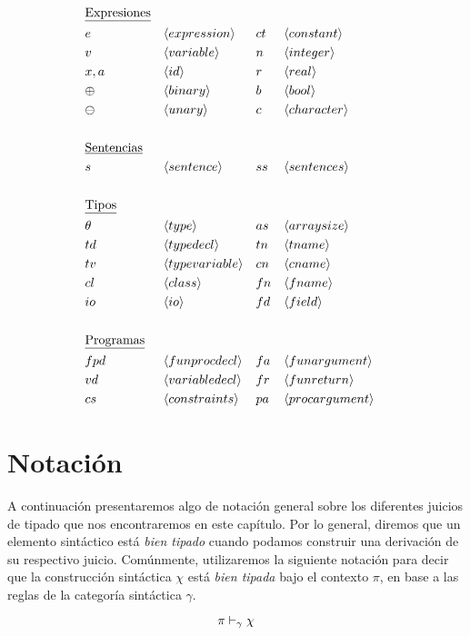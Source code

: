\begin{align*}
&\text{\underline{Expresiones}}
\\
&e       & &\langle expression \rangle     &  &ct      & &\langle constant \rangle       \\
&v       & &\langle variable \rangle       &  &n       & &\langle integer \rangle        \\
&x, a    & &\langle id \rangle             &  &r       & &\langle real \rangle           \\
&\oplus  & &\langle binary \rangle         &  &b       & &\langle bool \rangle           \\
&\ominus & &\langle unary \rangle          &  &c       & &\langle character \rangle      \\
\\
&\text{\underline{Sentencias}}
\\
&s       & &\langle sentence \rangle       &  &ss      & &\langle sentences \rangle      \\
\\
&\text{\underline{Tipos}}
\\
&\theta & &\langle type \rangle            &  &as      & &\langle arraysize \rangle      \\
&td     & &\langle typedecl \rangle        &  &tn      & &\langle tname \rangle          \\
&tv     & &\langle typevariable \rangle    &  &cn      & &\langle cname \rangle          \\
&cl     & &\langle class \rangle           &  &fn      & &\langle fname \rangle          \\
&io     & &\langle io \rangle              &  &fd      & &\langle field \rangle          \\
\\
&\text{\underline{Programas}}
\\
&fpd     & &\langle funprocdecl \rangle    &  &fa      & &\langle funargument \rangle    \\
&vd      & &\langle variabledecl \rangle   &  &fr      & &\langle funreturn \rangle      \\
&cs      & &\langle constraints \rangle    &  &pa      & &\langle procargument \rangle   \\
\end{align*}

\section{Notación}

A continuación presentaremos algo de notación general sobre los diferentes juicios de tipado que nos encontraremos en este capítulo. Por lo general, diremos que un elemento sintáctico está \textit{bien tipado} cuando podamos construir una derivación de su respectivo juicio.
Comúnmente, utilizaremos la siguiente notación para decir que la construcción sintáctica $\chi$ está \textit{bien tipada} bajo el contexto $\pi$, en base a las reglas de la categoría sintáctica $\gamma$.
\begin{gather*}
\pi \DASH{\gamma} \chi
\end{gather*}

